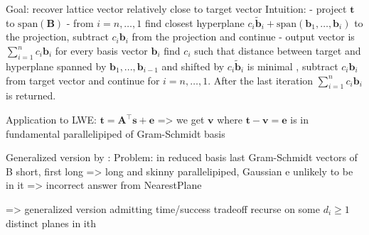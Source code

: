 Goal: recover lattice vector relatively close to target vector
Intuition:
- project $\mathbf{t}$ to $\text{span}(\mathbf{B})$
- from $i=n, \dots, 1$ find closest hyperplane $c_i \tilde{\mathbf{b}}_i + \text{span}(\mathbf{b}_1, \dots, \mathbf{b}_i)$ to the projection, subtract $c_i \mathbf{b}_i$ from the projection and continue %
- output vector is $\sum_{i=1}^n c_i \mathbf{b}_i$
for every basis vector $\mathbf{b}_i$ find $c_i$ such that distance between target and hyperplane spanned by $\mathbf{b}_1, ..., \mathbf{b}_{i-1}$ and shifted by $c_i \tilde{\mathbf{b}}_i$  is minimal %
, subtract $c_i \mathbf{b}_i$ from target vector and continue for $i=n, \dots, 1$. After the last iteration $\sum_{i=1}^n  c_i \mathbf{b}_i$ is returned.

Application to LWE: $\mathbf{t} = \mathbf{A}^\intercal\mathbf{s}+\mathbf{e}$ => we get $\mathbf{v}$ where $\mathbf{t}- \mathbf{v} = \mathbf{e}$ is in fundamental parallelipiped of Gram-Schmidt basis


Generalized version by \cite{LP11}:
Problem: in reduced basis last Gram-Schmidt vectors of B short, first long => long and skinny parallelipiped, Gaussian e unlikely to be in it => incorrect answer from NearestPlane

=> generalized version admitting time/success tradeoff
recurse on some $d_i \geq 1$ distinct planes in ith

